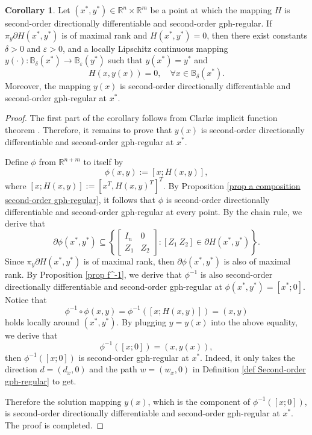 \documentclass[11pt]{article}
\theoremstyle{definition}
\newtheorem{corollary}[theorem]{Corollary}
\theoremstyle{remark}
\numberwithin{equation}{section}
\begin{document}
\begin{corollary}\label{cor implicit function outer second-order gph-regular}
Let $(x^*, y^*) \in \mathbb{R}^n \times \mathbb{R}^m$ be a point at which the mapping $H$ is   second-order directionally differentiable and second-order gph-regular.
  If $\pi_y\partial H(x^*,y^*)$  is of maximal
rank and $H(x^*,y^*)=0$,
 then there exist constants
$\delta>0$ and $\varepsilon>0$, and  a locally Lipschitz continuous mapping $
y(\cdot):\mathbb{B}_{\delta}(x^*)\to\mathbb{B}_{\varepsilon}(y^*)$ such that $y(x^*)=y^*$ and $$H(x,y(x))=0, \quad \forall x\in\mathbb{B}_{\delta}(x^*).$$
 Moreover, the mapping $y(x)$ is second-order directionally differentiable and second-order gph-regular at
$x^*$.
\end{corollary}

\begin{proof}
The first part of the corollary follows from Clarke   implicit function theorem \cite[p255]{Clarke}.
Therefore, it remains to prove that $y(x)$ is second-order directionally differentiable and second-order gph-regular at $x^*$.

      Define $\phi$ from $\mathbb{R}^{n+m}$ to itself by
            $$\phi(x,y):=[x;H(x,y)],$$
            where $[x;H(x,y)]:=[x^T,H(x,y)^T]^T$.
             By
         Proposition \ref{prop a composition second-order gph-regular}, it follows that  $\phi$ is
           second-order directionally differentiable and second-order gph-regular at every point.
By the chain rule, we derive that
 $$\partial
\phi(x^*,y^*)\subseteq\left\{\left[\begin{array}{cc}
                                                     I_n &0 \\
                                                    Z_1 & Z_2
                                                   \end{array}\right]:[Z_1~Z_2]\in \partial
                                                   H(x^*,y^*)\right\}.$$
  Since $\pi_y\partial H(x^*,y^*)$  is of maximal
rank, then $\partial \phi(x^*,y^*)$  is  also of maximal
rank.
             By
         Proposition \ref{prop f^-1}, we derive that $\phi^{-1}$ is also second-order directionally
         differentiable and second-order gph-regular at $\phi(x^*,y^*)=[x^*;0]$.
      Notice that
           $$\phi^{-1}\circ \phi(x,y)=\phi^{-1}([x;H(x,y)])=(x,y)$$
 holds locally around $(x^*,y^*)$. By plugging $y=y(x)$ into the above equality, we derive that
 $$\phi^{-1}([x;0])=(x,y(x)),$$
 then $\phi^{-1}([x;0])$ is  second-order gph-regular at $x^*$.
  Indeed, it only takes the direction $d=(d_x,0)$ and the path $w=(w_x,0)$ in Definition \ref{def Second-order gph-regular} to get.

Therefore the solution mapping $y(x)$, which is  the component of $\phi^{-1}([x;0])$,
         is second-order
directionally differentiable and second-order gph-regular at $x^*$. The proof is completed.
         \end{proof}
\end{document}
